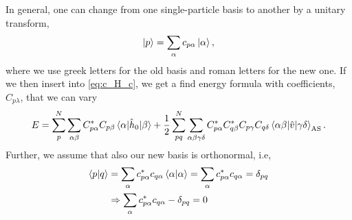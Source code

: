 In general, one can change from one single-particle basis to another by a unitary transform,
\begin{equation}
\ket{p}=\sum_{\alpha}c_{p\alpha}\ket{\alpha},
\end{equation}
where we use greek letters for the old basis and roman letters for the new one. If we then insert into \eqref{eq:c_H_c}, we get a find energy formula with coefficients, $C_{p\lambda}$, that we can vary
\begin{equation}
E=\sum_{p}^N\sum_{\alpha\beta}C_{p\alpha}^*C_{p\beta}\mel{\alpha}{\hat{h}_0}{\beta}+\frac{1}{2}
\sum_{pq}^N\sum_{\alpha\beta\gamma\delta}C_{p\alpha}^*C_{q\beta}^*C_{p\gamma}C_{q\delta}\mel{\alpha\beta}{\hat{v}}{\gamma\delta}_{\text{AS}}.
\end{equation}
Further, we assume that also our new basis is orthonormal, i.e,
\begin{align}
	\braket{p}{q}&=\sum_{\alpha}c_{p\alpha}^*c_{q\alpha}\braket{\alpha}{\alpha}=\sum_{\alpha}c_{p\alpha}^*c_{q\alpha}=\delta_{pq}\\
	&\Rightarrow\sum_{\alpha}c_{p\alpha}^*c_{q\alpha}-\delta_{pq}=0\label{eq:constraint}
\end{align}

